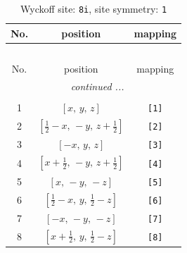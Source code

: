\documentclass[fleqn,8pt]{jsarticle}
\begin{document}
\renewcommand{\arraystretch}{1.2}
\begin{longtable}{ccc}
\caption{Wyckoff site: {\tt 8i}, site symmetry: {\tt 1}}
 \\
 \hline \hline
No. & position & mapping \\ \hline \endfirsthead

\multicolumn{2}{l}{\tablename\ \thetable{}} \\
 \hline \hline
No. & position & mapping \\ \hline \endhead

 \hline \hline
\multicolumn{2}{r}{\footnotesize\it continued ...} \\ \endfoot

 \hline \hline
\multicolumn{2}{r}{} \\ \endlastfoot

1 & $\left[ x,\, y,\, z \right]$ & {\tt [1]} \\ \hline
2 & $\left[ \frac{1}{2} - x,\, - y,\, z + \frac{1}{2} \right]$ & {\tt [2]} \\ \hline
3 & $\left[ - x,\, y,\, z \right]$ & {\tt [3]} \\ \hline
4 & $\left[ x + \frac{1}{2},\, - y,\, z + \frac{1}{2} \right]$ & {\tt [4]} \\ \hline
5 & $\left[ x,\, - y,\, - z \right]$ & {\tt [5]} \\ \hline
6 & $\left[ \frac{1}{2} - x,\, y,\, \frac{1}{2} - z \right]$ & {\tt [6]} \\ \hline
7 & $\left[ - x,\, - y,\, - z \right]$ & {\tt [7]} \\ \hline
8 & $\left[ x + \frac{1}{2},\, y,\, \frac{1}{2} - z \right]$ & {\tt [8]} \\
\end{longtable}
\end{document}
